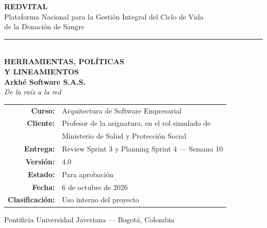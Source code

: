 \documentclass[11pt,a4paper]{article}
\begin{document}
\begin{titlepage}
\centering
\thispagestyle{empty}
\vspace*{1.8cm}


{\Huge\bfseries\color{vinotinto} REDVITAL}\\[0.5cm]
{\large\color{vinotinto} Plataforma Nacional para la Gestión Integral del Ciclo de Vida\\ de la Donación de Sangre}\\[1.7cm]

{\color{vinotinto}\rule{0.45\textwidth}{1.2pt}}\\[1.7cm]

{\LARGE\bfseries HERRAMIENTAS, POLÍTICAS}\\[0.4cm]
{\LARGE\bfseries Y LINEAMIENTOS}\\[2.0cm]

{\large\bfseries Arkhé Software S.A.S.}\\[0.3cm]
{\itshape De la raíz a la red}\\[1.9cm]

\begin{tabular}{r l}
\textbf{Curso:} & Arquitectura de Software Empresarial \\
\textbf{Cliente:} & Profesor de la asignatura, en el rol simulado de \\
 & Ministerio de Salud y Protección Social \\
\textbf{Entrega:} & Review Sprint 3 y Planning Sprint 4 — Semana 10 \\
\textbf{Versión:} & 4.0 \\
\textbf{Estado:} & Para aprobación \\
\textbf{Fecha:} & 6 de octubre de 2026 \\
\textbf{Clasificación:} & Uso interno del proyecto \\
\end{tabular}

\vfill
{\small\color{grisTexto} Pontificia Universidad Javeriana — Bogotá, Colombia}
\end{titlepage}

\end{document}
